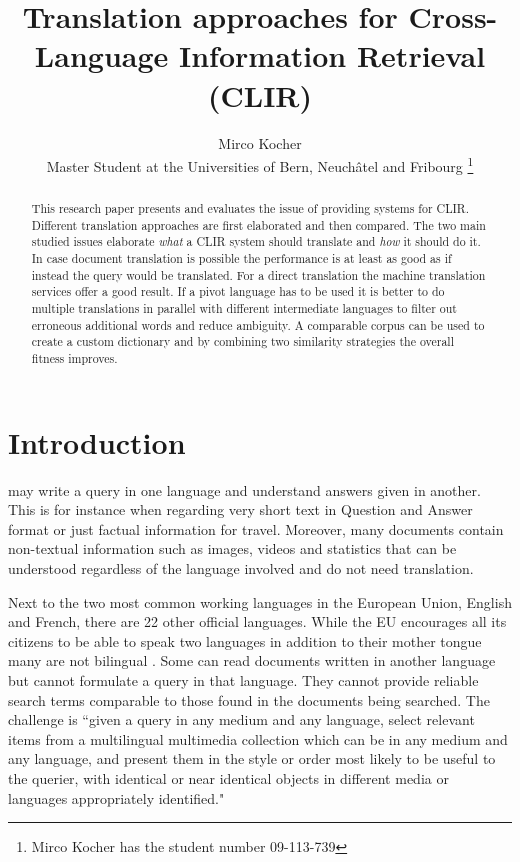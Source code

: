 \documentclass[journal]{IEEEtran}
\begin{document}
\title{Translation approaches for Cross-Language Information Retrieval (CLIR)}

\author{Mirco Kocher\\
Master Student at the Universities of Bern, Neuch\^{a}tel and Fribourg
\thanks{Mirco Kocher has the student number 09-113-739} %
}


\maketitle



\begin{abstract}
This research paper presents and evaluates the issue of providing systems for CLIR.
Different translation approaches are first elaborated and then compared.
The two main studied issues elaborate \textit{what} a CLIR system should translate and \textit{how} it should do it.
In case document translation is possible the performance is at least as good as if instead the query would be translated.
For a direct translation the machine translation services offer a good result.
If a pivot language has to be used it is better to do multiple translations in parallel with different intermediate languages to filter out erroneous additional words and reduce ambiguity.
A comparable corpus can be used to create a custom dictionary and by combining two similarity strategies the overall fitness improves.
\end{abstract}



\section{Introduction}
 may write a query in one language and understand answers given in another.
This is for instance when regarding very short text in Question and Answer format or just factual information for travel.
Moreover, many documents contain non-textual information such as images, videos and statistics that can be understood regardless of the language involved and do not need translation.

Next to the two most common working languages in the European Union, English and French, there are 22 other official languages.
While the EU encourages all its citizens to be able to speak two languages in addition to their mother tongue many are not bilingual \cite{ebs386}.
Some can read documents written in another language but cannot formulate a query in that language.
They cannot provide reliable search terms comparable to those found in the documents being searched.
The challenge is ``given a query in any medium and any language, select relevant items from a multilingual multimedia collection which can be in any medium and any language, and present them in the style or order most likely to be useful to the querier, with identical or near identical objects in different media or languages appropriately identified." \cite{oard97a}
\end{document}
